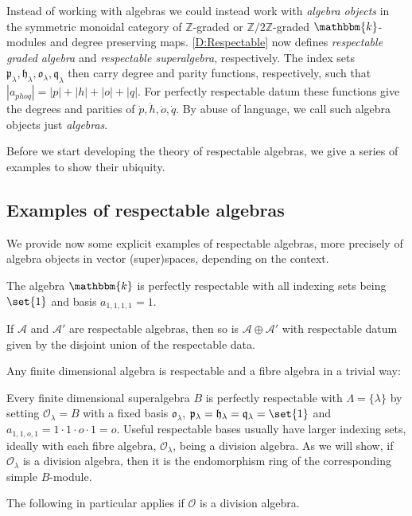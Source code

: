 \documentclass[a4paper,11pt]{amsart}
\numberwithin{equation}{subsection}
\theoremstyle{definition}
\theoremstyle{theorem}
\theoremstyle{remark}
\newcommand\CA{\mathcal{A}}
\newcommand\CO{\mathcal{O}}
\newcommand\plam[1][\lambda]{\mathfrak{p}_{#1}}
\newcommand\hlam[1][\lambda]{\mathfrak{h}_{#1}}
\newcommand\qlam[1][\lambda]{\mathfrak{q}_{#1}}
\newcommand\Olam[1][\lambda]{\CO_{#1}}
\newcommand\olam[1][\lambda]{\mathfrak{o}_{#1}}
\newcommand\kk{\mathbbm{k}}
\newcommand\Z{\mathbb{Z}}
\begin{document}
\begin{Definition}
    Instead of working with algebras we could instead work with
    \emph{algebra objects} in the symmetric monoidal category of
    $\Z$-graded or $\Z/2\Z$-graded $\kk$-modules and degree preserving
    maps. \autoref{D:Respectable} now defines \emph{respectable graded
    algebra} and \emph{respectable superalgebra}, respectively. The
    index sets $\plam,\hlam,\olam,\qlam$ then carry degree and parity
    functions, respectively, such that $|a_{phoq}|=|p|+|h|+|o|+|q|$. For
    perfectly respectable datum these functions give the degrees and
    parities of $\dot p,\dot h,\dot o,\dot q$. By abuse of language, we call such algebra objects just \emph{algebras}.
\end{Definition}

Before we start developing the theory of respectable algebras, we give a
series of examples to show their ubiquity.

\subsection{Examples of respectable algebras}
We provide now some explicit examples of respectable algebras, more precisely of algebra objects in vector (super)spaces, depending on the context.
\begin{Example}\label{verystupid}
The algebra $\kk$ is perfectly respectable with all indexing sets being $\set{1}$ and basis  $a_{1,1,1,1}=1$.
\end{Example}
\begin{Example}\label{sumrespectable}
If $\CA$ and $\CA'$ are respectable algebras, then so is $\CA\oplus \CA'$ with respectable datum given by the disjoint union of the respectable data.
\end{Example}
Any finite dimensional algebra is respectable and a fibre algebra in a trivial way:
\begin{Example}\label{stupid} Every finite dimensional superalgebra $B$ is perfectly
respectable with $\Lambda=\{\lambda\}$ by setting  $\Olam=B$ with a fixed basis $\olam$,
$\plam=\hlam=\qlam=\set{1}$ and $a_{1,1,o,1}=1\cdot 1\cdot o\cdot 1=o$.
Useful respectable bases usually have larger indexing sets, ideally with
each fibre algebra, $\Olam$, being a division algebra. As we will
show, if $\Olam$ is a division algebra, then it is the endomorphism ring
of the corresponding simple $B$-module.
\end{Example}


The following in particular applies if $\CO$ is a division algebra.
\end{document}
